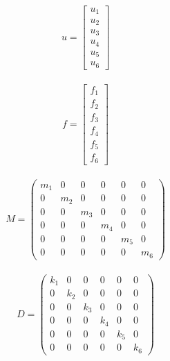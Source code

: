 \begin{eqnarray}
    u = 
    \begin{bmatrix}
        u_1 \\
        u_2 \\
        u_3 \\
        u_4 \\
        u_5 \\
        u_6 
    \end{bmatrix}
\end{eqnarray}

\begin{eqnarray}
    f = 
    \begin{bmatrix}
        f_1 \\
        f_2 \\
        f_3 \\
        f_4 \\
        f_5 \\
        f_6 
    \end{bmatrix}
\end{eqnarray}

\begin{eqnarray}
    M = 
    \left(\begin{matrix}
        m_1 & 0   & 0   & 0   & 0   & 0   \\
        0   & m_2 & 0   & 0   & 0   & 0   \\
        0   & 0   & m_3 & 0   & 0   & 0   \\
        0   & 0   & 0   & m_4 & 0   & 0   \\
        0   & 0   & 0   & 0   & m_5 & 0   \\
        0   & 0   & 0   & 0   & 0   & m_6 
    \end{matrix}\right)
\end{eqnarray}

\begin{eqnarray}
    D =
    \left(\begin{matrix}
        k_1 & 0   & 0   & 0   & 0   & 0    \\
        0   & k_2 & 0   & 0   & 0   & 0    \\
        0   & 0   & k_3 & 0   & 0   & 0    \\
        0   & 0   & 0   & k_4 & 0   & 0    \\
        0   & 0   & 0   & 0   & k_5 & 0    \\
        0   & 0   & 0   & 0   & 0   & k_6  
    \end{matrix}\right)
\end{eqnarray}

